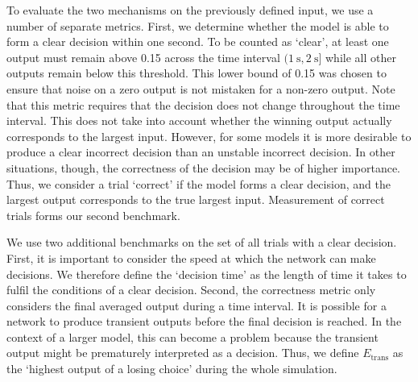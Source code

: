\documentclass[10pt,letterpaper]{article}
\begin{document}
To evaluate the two mechanisms on the previously defined input, we use a number of separate metrics.
First, we determine whether the model is able to form a clear decision within one second.
To be counted as `clear', at least one output must remain above 0.15 across the time interval $(\SI{1}{\second}, \SI{2}{\second}]$ while all other outputs remain below this threshold. %
This lower bound of 0.15 was chosen to ensure that noise on a zero output is not mistaken for a non-zero output.
Note that this metric requires that the decision does not change throughout the time interval.
This does not take into account whether the winning output actually corresponds to the largest input. 
However, for some models it is more desirable to produce a clear incorrect decision than an unstable incorrect decision.
In other situations, though, the correctness of the decision may be of higher importance.
Thus, we consider a trial `correct' if the model forms a clear decision, and the largest output corresponds to the true largest input.  
Measurement of correct trials forms our second benchmark.

We use two additional benchmarks on the set of all trials with a clear decision.
First, it is important to consider the speed at which the network can make decisions.
We therefore define the `decision time' as the length of time it takes to fulfil the conditions of a clear decision.
Second, the correctness metric only considers the final averaged output during a time interval.
It is possible for a network to produce transient outputs before the final decision is reached.
In the context of a larger model, this can become a problem because the transient output might be prematurely interpreted as a decision.
Thus, we define $E_{\mathrm{trans}}$ as the `highest output of a losing choice' during the whole simulation.
\end{document}
